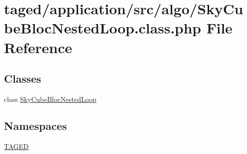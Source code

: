 \hypertarget{_sky_cube_bloc_nested_loop_8class_8php}{}\section{taged/application/src/algo/\+Sky\+Cube\+Bloc\+Nested\+Loop.class.\+php File Reference}
\label{_sky_cube_bloc_nested_loop_8class_8php}
\subsection*{Classes}
\begin{DoxyCompactItemize}
\item 
class \hyperlink{class_sky_cube_bloc_nested_loop}{Sky\+Cube\+Bloc\+Nested\+Loop}
\end{DoxyCompactItemize}
\subsection*{Namespaces}
\begin{DoxyCompactItemize}
\item 
 \hyperlink{namespace_t_a_g_e_d}{T\+A\+G\+ED}
\end{DoxyCompactItemize}
